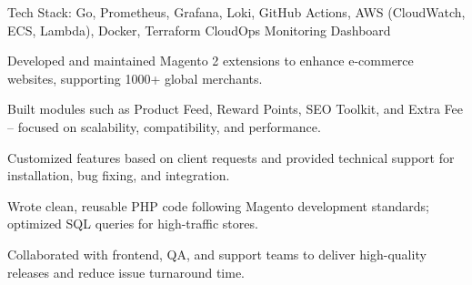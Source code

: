 

\begin{cventries}

  \cventry
    {Tech Stack: Go, Prometheus, Grafana, Loki, GitHub Actions, AWS (CloudWatch, ECS, Lambda), Docker, Terraform} %
    {CloudOps Monitoring Dashboard} %
    {}
    {}
    {
      \begin{cvitems} %
        \item {Developed and maintained Magento 2 extensions to enhance e-commerce websites, supporting 1000+ global merchants.}
        \item {Built modules such as Product Feed, Reward Points, SEO Toolkit, and Extra Fee – focused on scalability, compatibility, and performance.}
        \item {Customized features based on client requests and provided technical support for installation, bug fixing, and integration.}
        \item {Wrote clean, reusable PHP code following Magento development standards; optimized SQL queries for high-traffic stores.}
        \item {Collaborated with frontend, QA, and support teams to deliver high-quality releases and reduce issue turnaround time.}
      \end{cvitems}
    }

\end{cventries}
